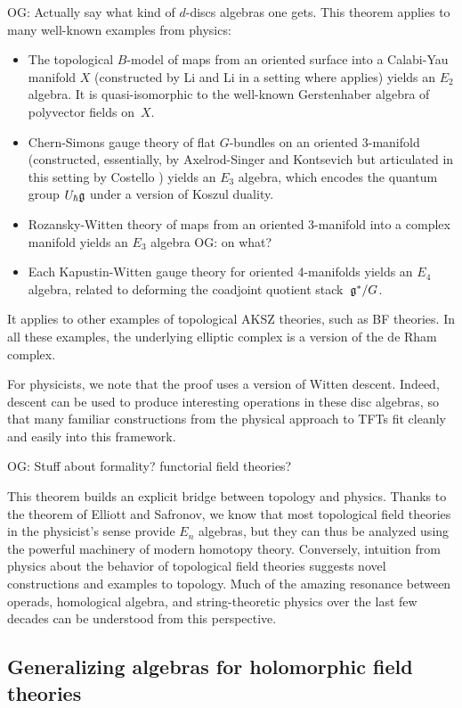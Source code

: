 \documentclass[11pt]{amsart}
\def\owen#1{{\textcolor{violet!65!black}{OG: {#1}}}}
\begin{document}
\owen{Actually say what kind of $d$-discs algebras one gets.}
This theorem applies to many well-known examples from physics:
\begin{itemize}
\item The topological $B$-model of maps from an oriented surface into a Calabi-Yau manifold $X$ (constructed by Li and Li \cite{LiLi} in a setting where \cite{EllSaf} applies) yields an $E_2$ algebra. It is quasi-isomorphic to the well-known Gerstenhaber algebra of polyvector fields on~$X$.
\item Chern-Simons gauge theory of flat $G$-bundles on an oriented 3-manifold (constructed, essentially, by Axelrod-Singer \cite{AxeSin} and Kontsevich \cite{KonECM} but articulated in this setting by Costello \cite{CosBook}) yields an $E_3$ algebra, which encodes the quantum group $U_\hbar \mathfrak g$ under a version of Koszul duality.
\item Rozansky-Witten theory of maps from an oriented 3-manifold into a complex manifold \cite{ChanLeungLi} yields an $E_3$ algebra \owen{on what?}
\item Each Kapustin-Witten gauge theory for oriented 4-manifolds \cite{EGW} yields an $E_4$ algebra, related to deforming the coadjoint quotient stack~$\mathfrak g^*/G$.
\end{itemize}
It applies to other examples of topological AKSZ theories, such as BF theories.
In all these examples, the underlying elliptic complex is a version of the de Rham complex.

For physicists, we note that the proof uses a version of Witten descent.
Indeed, descent can be used to produce interesting operations in these disc algebras,
so that many familiar constructions from the physical approach to TFTs fit cleanly and easily into this framework.

\owen{Stuff about formality? functorial field theories?}

This theorem builds an explicit bridge between topology and physics. 
Thanks to the theorem of Elliott and Safronov, we know that most topological field theories in the physicist's sense provide $E_n$ algebras,
but they can thus be analyzed using the powerful machinery of modern homotopy theory. 
Conversely, intuition from physics about the behavior of topological field theories suggests novel constructions and examples to topology. 
Much of the amazing resonance between operads, homological algebra, and string-theoretic physics over the last few decades can be understood from this perspective.

\subsection{Generalizing algebras for holomorphic field theories}
\end{document}
